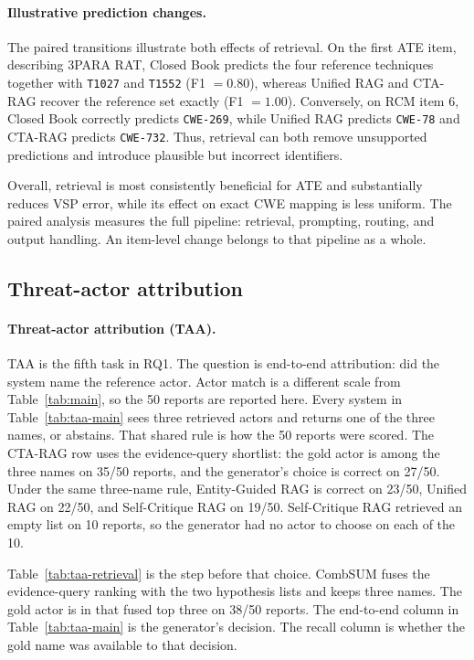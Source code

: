 \documentclass[5p,times,authoryear]{elsarticle}
\begin{document}
\paragraph{Illustrative prediction changes.}
The paired transitions illustrate both effects of retrieval. On the first
ATE item, describing 3PARA RAT, Closed Book predicts the four reference
techniques together with \texttt{T1027} and \texttt{T1552} (F1 $=0.80$),
whereas Unified RAG and CTA-RAG recover the reference set exactly
(F1 $=1.00$). Conversely, on RCM item 6, Closed Book correctly predicts
\texttt{CWE-269}, while Unified RAG predicts \texttt{CWE-78} and CTA-RAG
predicts \texttt{CWE-732}. Thus, retrieval can both remove unsupported
predictions and introduce plausible but incorrect identifiers.

Overall, retrieval is most consistently beneficial for ATE and substantially
reduces VSP error, while its effect on exact CWE mapping is less uniform.
The paired analysis measures the full pipeline: retrieval, prompting, routing, and output handling. An item-level change belongs to that pipeline as a whole.

\subsection{Threat-actor attribution}
\label{sec:taa-results}

\paragraph{Threat-actor attribution (TAA).}
TAA is the fifth task in RQ1. The question is end-to-end attribution: did the system name the reference actor. Actor match is a different scale from Table~\ref{tab:main}, so the 50 reports are reported here. Every system in Table~\ref{tab:taa-main} sees three retrieved actors and returns one of the three names, or abstains. That shared rule is how the 50 reports were scored. The CTA-RAG row uses the evidence-query shortlist: the gold actor is among the three names on 35/50 reports, and the generator's choice is correct on 27/50. Under the same three-name rule, Entity-Guided RAG is correct on 23/50, Unified RAG on 22/50, and Self-Critique RAG on 19/50. Self-Critique RAG retrieved an empty list on 10 reports, so the generator had no actor to choose on each of the 10.

Table~\ref{tab:taa-retrieval} is the step before that choice. CombSUM fuses the evidence-query ranking with the two hypothesis lists and keeps three names. The gold actor is in that fused top three on 38/50 reports. The end-to-end column in Table~\ref{tab:taa-main} is the generator's decision. The recall column is whether the gold name was available to that decision.
\end{document}
